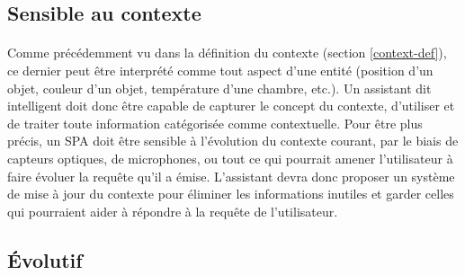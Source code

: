 \subsection{Sensible au contexte}
\paragraph{}
Comme précédemment vu dans la définition du contexte (section \ref{context-def}), ce dernier peut être interprété comme tout aspect d'une entité (position d'un objet, couleur d'un objet, température d'une chambre, etc.). Un assistant dit intelligent doit donc être capable de capturer le concept du contexte, d'utiliser et de traiter toute information catégorisée comme contextuelle.
Pour être plus précis, un SPA doit être sensible à l'évolution du contexte courant, par le biais de capteurs optiques, de microphones, ou tout ce qui pourrait amener l'utilisateur à faire évoluer la requête qu'il a émise. L'assistant devra donc proposer un système de mise à jour du contexte pour éliminer les informations inutiles et garder celles qui pourraient aider à répondre à la requête de l'utilisateur.
\subsection{Évolutif}
